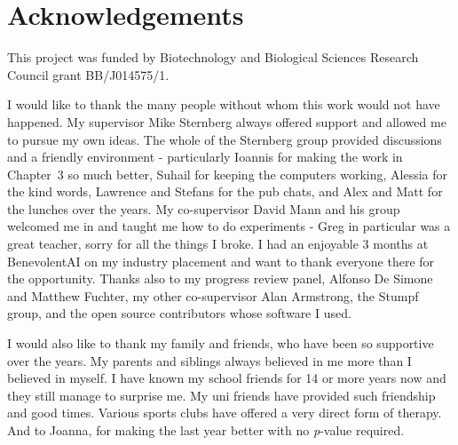 \chapter*{Acknowledgements}

This project was funded by Biotechnology and Biological Sciences Research Council grant BB/J014575/1.

I would like to thank the many people without whom this work would not have happened.
My supervisor Mike Sternberg always offered support and allowed me to pursue my own ideas.
The whole of the Sternberg group provided discussions and a friendly environment - particularly Ioannis for making the work in Chapter~3 so much better, Suhail for keeping the computers working, Alessia for the kind words, Lawrence and Stefans for the pub chats, and Alex and Matt for the lunches over the years.
My co-supervisor David Mann and his group welcomed me in and taught me how to do experiments - Greg in particular was a great teacher, sorry for all the things I broke.
I had an enjoyable 3 months at BenevolentAI on my industry placement and want to thank everyone there for the opportunity.
Thanks also to my progress review panel, Alfonso De Simone and Matthew Fuchter, my other co-supervisor Alan Armstrong, the Stumpf group, and the open source contributors whose software I used.

I would also like to thank my family and friends, who have been so supportive over the years.
My parents and siblings always believed in me more than I believed in myself.
I have known my school friends for 14 or more years now and they still manage to surprise me.
My uni friends have provided such friendship and good times.
Various sports clubs have offered a very direct form of therapy.
And to Joanna, for making the last year better with no \textit{p}-value required.
